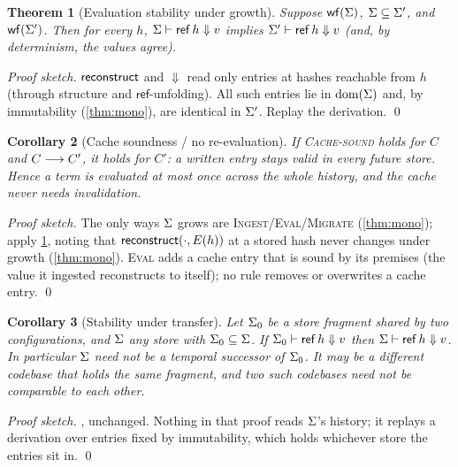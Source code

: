 \documentclass[11pt]{article}
\theoremstyle{definition}
\theoremstyle{plain}
\newtheorem{theorem}{Theorem}[section]
\newtheorem{corollary}[theorem]{Corollary}
\theoremstyle{remark}
\begin{document}
\begin{theorem}[Evaluation stability under growth]\label{thm:stability}
Suppose $\mathsf{wf}(\Sigma)$, $\Sigma \subseteq \Sigma'$, and $\mathsf{wf}(\Sigma')$. Then for every $h$,
$\Sigma \vdash \mathsf{ref}\,h \Downarrow v$ implies $\Sigma' \vdash \mathsf{ref}\,h \Downarrow v$ (and, by
determinism, the values agree).
\end{theorem}
\begin{proof}[Proof sketch]
$\mathsf{reconstruct}$ and $\Downarrow$ read only entries at hashes reachable from $h$ (through structure
and $\mathsf{ref}$-unfolding). All such entries lie in $\operatorname{dom}(\Sigma)$ and, by immutability
(\cref{thm:mono}), are identical in $\Sigma'$. Replay the derivation. \qed
\end{proof}

\begin{corollary}[Cache soundness / no re-evaluation]\label{cor:cache}
If \textsc{Cache-sound} holds for $C$ and $C \longrightarrow C'$, it holds for $C'$: a written entry
stays valid in every future store. Hence a term is evaluated at most once across the whole
history, and the cache never needs invalidation.
\end{corollary}
\begin{proof}[Proof sketch]
The only ways $\Sigma$ grows are \textsc{Ingest}/\textsc{Eval}/\textsc{Migrate}
(\cref{thm:mono}); apply \cref{thm:stability}, noting that
$\mathsf{reconstruct}(\cdot,E(h))$ at a stored hash never changes under growth
(\cref{thm:mono}). \textsc{Eval} adds a cache entry that is sound by its premises (the value
it ingested reconstructs to itself); no rule removes or overwrites a cache entry. \qed
\end{proof}

\begin{corollary}[Stability under transfer]\label{cor:transfer}
Let $\Sigma_0$ be a store fragment shared by two configurations, and $\Sigma$ any store with
$\Sigma_0 \subseteq \Sigma$. If $\Sigma_0 \vdash \mathsf{ref}\,h \Downarrow v$ then
$\Sigma \vdash \mathsf{ref}\,h \Downarrow v$. In particular $\Sigma$ need not be a temporal successor of
$\Sigma_0$. It may be a different codebase that holds the same fragment, and two such
codebases need not be comparable to each other.
\end{corollary}
\begin{proof}[Proof sketch]
, unchanged. Nothing in that proof reads $\Sigma$'s history; it replays a
derivation over entries fixed by immutability, which holds whichever store the entries sit
in. \qed
\end{proof}
\end{document}
